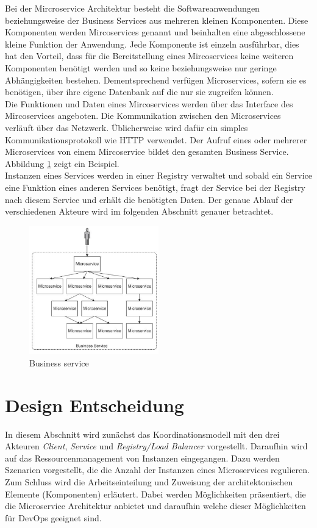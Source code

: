 Bei der Mircroservice Architektur besteht die Softwareanwendungen beziehungsweise der Business Services aus mehreren kleinen Komponenten. Diese Komponenten werden Mircoservices genannt und beinhalten eine abgeschlossene kleine Funktion der Anwendung. Jede Komponente ist einzeln ausführbar, dies hat den Vorteil, dass für die Bereitstellung eines Mircoservices keine weiteren Komponenten benötigt werden und so keine beziehungsweise nur geringe Abhängigkeiten bestehen. Dementsprechend verfügen Microservices, sofern sie es benötigen, über ihre eigene Datenbank auf die nur sie zugreifen können. \\
Die Funktionen und Daten eines Mircoservices werden über das Interface des Mircoservices angeboten. Die Kommunikation zwischen den Microservices verläuft über das Netzwerk. Üblicherweise wird dafür ein simples Kommunikationsprotokoll wie HTTP verwendet. Der Aufruf eines oder mehrerer Microservices von einem Mircoservice bildet den gesamten Business Service. Abbildung \ref{aService} zeigt ein Beispiel. \\
Instanzen eines Services werden in einer Registry verwaltet und sobald ein Service eine Funktion eines anderen Services benötigt, fragt der Service bei der Registry nach diesem Service und erhält die benötigten Daten. Der genaue Ablauf der verschiedenen Akteure wird im folgenden Abschnitt genauer betrachtet.\\

\begin{figure}[htbp]
  \centering
  \includegraphics[width=0.5\textwidth]{pictures/businessService.png}
	\caption{Business service}
	\label{aService}
\end{figure}

\section{Design Entscheidung}
In diesem Abschnitt wird zunächst das Koordinationsmodell mit den drei Akteuren \textit{Client}, \textit{Service} und \textit{Registry/Load Balancer} vorgestellt. Daraufhin wird auf das Ressourcenmanagement von Instanzen eingegangen. Dazu werden Szenarien vorgestellt, die die Anzahl der Instanzen eines Microservices regulieren. Zum Schluss wird die Arbeitseinteilung und Zuweisung der architektonischen Elemente (Komponenten) erläutert. Dabei werden Möglichkeiten präsentiert, die die Microservice Architektur anbietet und daraufhin welche dieser Möglichkeiten für DevOps geeignet sind.

